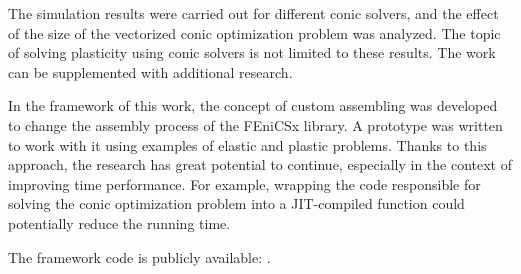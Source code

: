 \documentclass[12pt]{article}
\begin{document}
The simulation results were carried out for different conic solvers, and the effect of the size of the vectorized conic optimization problem was analyzed. The topic of solving plasticity using conic solvers is not limited to these results. The work can be supplemented with additional research.

In the framework of this work, the concept of custom assembling was developed to change the assembly process of the FEniCSx library. A prototype was written to work with it using examples of elastic and plastic problems. Thanks to this approach, the research has great potential to continue, especially in the context of improving time performance. For example, wrapping the code responsible for solving the conic optimization problem into a JIT-compiled function could potentially reduce the running time.

The framework code is publicly available: \parencite{convex-plasticity}.

\newpage
{}
{}
\renewcommand\refname{\centering Bibliography}
\printbibliography
\end{document}
